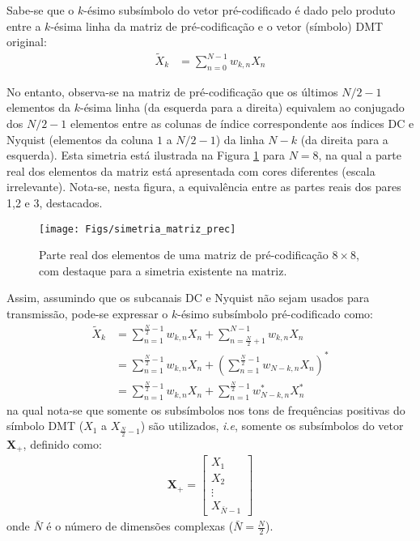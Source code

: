 Sabe-se que o $k$-ésimo subsímbolo do vetor pré-codificado é dado pelo produto entre a $k$-ésima linha da matriz de pré-codificação e o vetor (símbolo) DMT original:
\begin{align}
\tilde{X}_k &= \sum \limits_{n=0}^{N - 1} w_{k,n}X_n \nonumber
\end{align}

No entanto, observa-se na matriz de pré-codificação que os últimos $N/2 -1$ elementos da $k$-ésima linha (da esquerda para a direita) equivalem ao conjugado dos $N/2 -1$ elementos entre as colunas de índice correspondente aos índices DC e Nyquist (elementos da coluna $1$ a $N/2 -1$) da linha $N-k$ (da direita para a esquerda). Esta simetria está ilustrada na Figura \ref{fig:simetria_matriz_prec} para $N=8$, na qual a parte real dos elementos da matriz está apresentada com cores diferentes (escala irrelevante). Nota-se, nesta figura, a equivalência entre as partes reais dos pares 1,2 e 3, destacados.

\begin{figure}[htbp]
\centering
\texttt{[image: Figs/simetria\_matriz\_prec]}
\caption{ Parte real dos elementos de uma matriz de pré-codificação $8 \times 8$, com destaque para a simetria existente na matriz.  \label{fig:simetria_matriz_prec}}
\end{figure}

Assim, assumindo que os subcanais DC e Nyquist não sejam usados para transmissão, pode-se expressar o $k$-ésimo subsímbolo pré-codificado como:
\begin{align}
\tilde{X}_k &=\sum \limits_{n=1}^{ \frac{N}{2} - 1} w_{k,n}X_n +\sum \limits_{n=\frac{N}{2} + 1 }^{N - 1} w_{k,n}X_n  \nonumber\\
&= \sum \limits_{n=1}^{\frac{N}{2} - 1} w_{k,n}X_n + \left(\sum \limits_{n=1}^{\frac{N}{2} - 1} w_{N-k,n}X_n \right)^* \nonumber\\
&= \sum \limits_{n=1}^{\frac{N}{2} - 1} w_{k,n}X_n + \sum \limits_{n=1}^{\frac{N}{2} - 1} w_{N-k,n}^* X_n^*
\label{eq:two_summations_precoded_sub}
\end{align}
na qual nota-se que somente os subsímbolos nos tons de frequências positivas do símbolo DMT ($X_1$ a $X_{\frac{N}{2} -1}$) são utilizados, \textsl{i.e}, somente os subsímbolos do vetor $\mathbf{X_+}$, definido como:
\begin{align}
\mathbf{X_+} = \left[ \begin{array}{c}
X_1\\X_2\\ \vdots \\ X_{\bar{N} -1}
\end{array} \right]
\end{align}
onde $\bar{N}$ é o número de dimensões complexas ($\bar{N} = \frac{N}{2}$).


